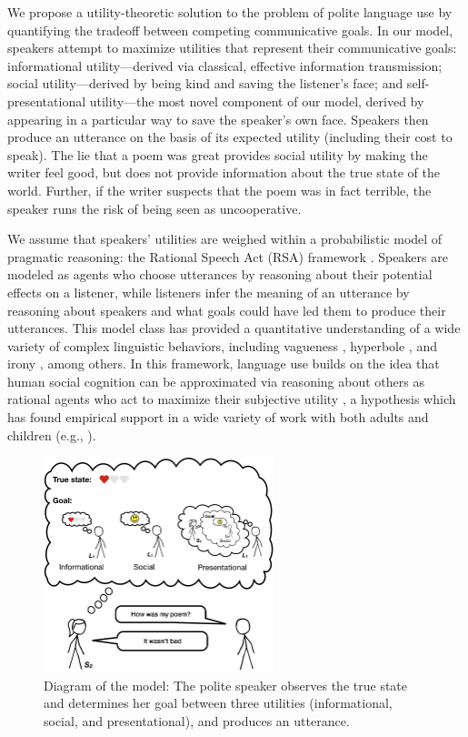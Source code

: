 \documentclass[9pt,twocolumn,twoside,lineno]{main_class_file}
\begin{document}
We propose a utility-theoretic solution to the problem of polite language use by quantifying the tradeoff between
competing communicative goals.
In our model, speakers attempt to maximize utilities that represent their communicative goals:
informational utility---derived via classical, effective
information transmission; social utility---derived by being kind and
saving the listener's face; and self-presentational utility---the most novel component of our model, 
derived by appearing in a particular way to save the speaker's own face.
Speakers then produce an utterance on the basis of
its expected utility (including their cost to speak).
The lie that a poem was great provides social utility by making the writer feel good, but does not provide information about the true state of the world.
Further, if the writer suspects that the poem was in fact terrible, the speaker runs the risk of being seen as uncooperative.

We assume that speakers' utilities are weighed within a probabilistic model of pragmatic reasoning: the Rational Speech Act (RSA) framework \cite{frank2012, goodman2016}. Speakers are modeled as
agents who choose utterances by reasoning about their potential effects on a
listener, while listeners infer the meaning of an utterance by reasoning about speakers and what goals could have led them to produce their utterances.
This model class has provided a quantitative understanding of a wide variety of complex linguistic behaviors, including vagueness \cite{lassiter2017adjectival}, hyperbole \cite{kao2014}, and irony
\cite{kao2015}, among others.
In this framework, language use builds on the idea that human social cognition can
be approximated via reasoning about others as rational agents who act to
maximize their subjective utility \cite{baker2009action}, a
hypothesis which has found empirical support in a wide variety of work with both
adults and children (e.g., \cite{jara2016naive, liu2017ten}).

\begin{figure}[!h]
\includegraphics[width=0.6\textwidth]{fig/model} \centering \caption{Diagram of the model: The polite speaker observes the true state and determines her goal between three utilities (informational, social, and presentational), and produces an utterance.}\label{fig:model}
\end{figure}
\end{document}
